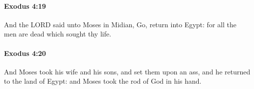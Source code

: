 		\paragraph{Exodus 4:19} %
			\label{EXODUS-4-19}

			And the LORD said unto Moses in Midian, Go, return into Egypt: for all the men are dead which sought thy life.


		\paragraph{Exodus 4:20} %
			\label{EXODUS-4-20}

			And Moses took his wife and his sons, and set them upon an ass, and he returned to the land of Egypt: and Moses took the rod of God in his hand.


